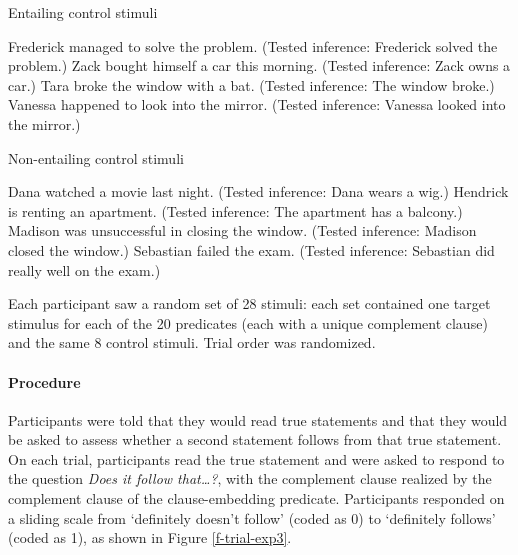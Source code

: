 \documentclass[11pt,fleqn]{article}
\newcommand{\6}{\mbox{$[\hspace*{-.6mm}[$}}
\newcommand{\9}{\mbox{$]\hspace*{-.6mm}]$}}
\begin{document}
\begin{exe}
\ex\label{control-good2} Entailing control stimuli
\begin{xlist}
 Frederick managed to solve the problem. (Tested inference: Frederick solved the problem.)
 Zack bought himself a car this morning. (Tested inference: Zack owns a car.)
 Tara broke the window with a bat. (Tested inference: The window broke.)
 Vanessa happened to look into the mirror. (Tested inference: Vanessa looked into the mirror.)
\end{xlist}
\ex\label{control-bad2} Non-entailing control stimuli
\begin{xlist}
 Dana watched a movie last night. (Tested inference: Dana wears a wig.)
 Hendrick is renting an apartment. (Tested inference: The apartment has a balcony.)
 Madison was unsuccessful in closing the window. (Tested inference:  Madison closed the window.)
 Sebastian failed the exam. (Tested inference: Sebastian did really well on the exam.)
\end{xlist}
\end{exe}

Each participant saw a random set of 28 stimuli: each set contained one target stimulus for each of the 20 predicates (each with a unique complement clause) and the same 8 control stimuli. Trial order was randomized.

\paragraph{Procedure} Participants were told that they would read true statements and that they would be asked to assess whether a second statement follows from that true statement. On each trial, participants read the true statement and were asked to respond to the question {\em Does it follow that\ldots?}, with the complement clause realized by the complement clause of the clause-embedding predicate. Participants responded on a sliding scale from `definitely doesn't follow' (coded as 0) to `definitely follows' (coded as 1), as shown in Figure \ref{f-trial-exp3}.
\end{document}
